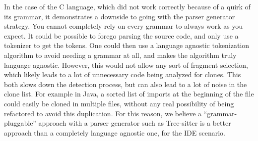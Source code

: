 In the case of the C language, which did not work correctly because of a quirk of its
grammar, it demonstrates a downside to going with the parser generator strategy. You
cannot completely rely on every grammar to always work as you expect. It could be possible
to forego parsing the source code, and only use a tokenizer to get the tokens. One could
then use a language agnostic tokenization algorithm to avoid needing a grammar at all, and
makes the algorithm truly language agnostic. However, this would not allow any sort of
fragment selection, which likely leads to a lot of unnecessary code being analyzed for
clones. This both slows down the detection process, but can also lead to a lot of noise in
the clone list. For example in Java, a sorted list of imports at the beginning of the file
could easily be cloned in multiple files, without any real possibility of being refactored
to avoid this duplication. For this reason, we believe a ``grammar-pluggable'' approach
with a parser generator such as Tree-sitter is a better approach than a completely
language agnostic one, for the IDE scenario.
